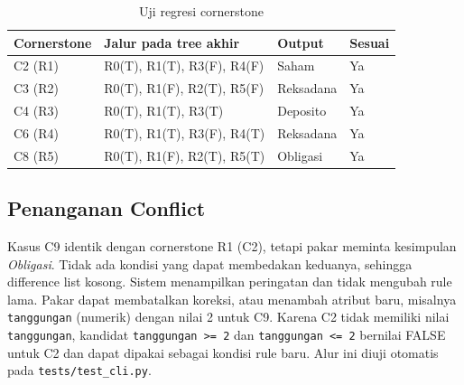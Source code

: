 \documentclass[11pt,a4paper]{article}
\newcommand{\cond}[1]{\texttt{#1}}
\begin{document}
\begin{table}[H]
\centering
\begin{tabular}{llll}
\toprule
\textbf{Cornerstone} & \textbf{Jalur pada tree akhir} & \textbf{Output} & \textbf{Sesuai} \\
\midrule
C2 (R1) & R0(T), R1(T), R3(F), R4(F) & Saham & Ya \\
C3 (R2) & R0(T), R1(F), R2(T), R5(F) & Reksadana & Ya \\
C4 (R3) & R0(T), R1(T), R3(T) & Deposito & Ya \\
C6 (R4) & R0(T), R1(T), R3(F), R4(T) & Reksadana & Ya \\
C8 (R5) & R0(T), R1(F), R2(T), R5(T) & Obligasi & Ya \\
\bottomrule
\end{tabular}
\caption{Uji regresi cornerstone}
\end{table}

\subsection{Penanganan Conflict}
Kasus C9 identik dengan cornerstone R1 (C2), tetapi pakar meminta kesimpulan \emph{Obligasi}.
Tidak ada kondisi yang dapat membedakan keduanya, sehingga difference list kosong. Sistem
menampilkan peringatan dan tidak mengubah rule lama. Pakar dapat membatalkan koreksi, atau
menambah atribut baru, misalnya \texttt{tanggungan} (numerik) dengan nilai 2 untuk C9. Karena
C2 tidak memiliki nilai \texttt{tanggungan}, kandidat \cond{tanggungan >= 2} dan
\cond{tanggungan <= 2} bernilai FALSE untuk C2 dan dapat dipakai sebagai kondisi rule baru.
Alur ini diuji otomatis pada \texttt{tests/test\_cli.py}.
\end{document}

